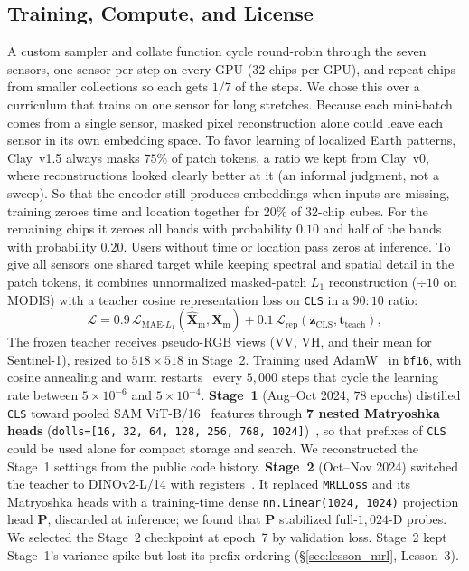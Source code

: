 \subsection{Training, Compute, and License}
\label{sec:lineage}

A custom sampler and collate function cycle round-robin through the seven sensors, one sensor per step on every GPU ($32$ chips per GPU), and repeat chips from smaller collections so each gets $1/7$ of the steps. We chose this over a curriculum that trains on one sensor for long stretches. Because each mini-batch comes from a single sensor, masked pixel reconstruction alone could leave each sensor in its own embedding space. To favor learning of localized Earth patterns, Clay~v1.5 always masks $75\%$ of patch tokens, a ratio we kept from Clay~v0, where reconstructions looked clearly better at it (an informal judgment, not a sweep). So that the encoder still produces embeddings when inputs are missing, training zeroes time and location together for $20\%$ of 32-chip cubes. For the remaining chips it zeroes all bands with probability $0.10$ and half of the bands with probability $0.20$. Users without time or location pass zeros at inference. To give all sensors one shared target while keeping spectral and spatial detail in the patch tokens, it combines unnormalized masked-patch $L_1$ reconstruction ($\div 10$ on MODIS) with a teacher cosine representation loss on \texttt{CLS} in a $90{:}10$ ratio:
{\small
\begin{equation}
\mathcal{L} = 0.9\,\mathcal{L}_{\mathrm{MAE}\text{-}L_1}(\hat{\bm{X}}_{\mathrm{m}}, \bm{X}_{\mathrm{m}}) + 0.1\,\mathcal{L}_{\mathrm{rep}}(\bm{z}_{\mathrm{CLS}}, \bm{t}_{\mathrm{teach}}),
\label{eq:loss}
\end{equation}}%
The frozen teacher receives pseudo-RGB views (VV, VH, and their mean for Sentinel-1), resized to $518\times 518$ in Stage~2. Training used AdamW~\cite{loshchilov2019adamw} in \texttt{bf16}, with cosine annealing and warm restarts~\cite{loshchilov2017sgdr} every $5{,}000$ steps that cycle the learning rate between $5\times 10^{-6}$ and $5\times 10^{-4}$. \textbf{Stage~1} (Aug--Oct 2024, $78$ epochs) distilled \texttt{CLS} toward pooled SAM ViT-B/16~\cite{kirillov2023sam} features through \textbf{7 nested Matryoshka heads} (\texttt{dolls=[16, 32, 64, 128, 256, 768, 1024]})~\cite{kusupati2022matryoshka}, so that prefixes of \texttt{CLS} could be used alone for compact storage and search. We reconstructed the Stage~1 settings from the public code history. \textbf{Stage~2} (Oct--Nov 2024) switched the teacher to DINOv2-L/14 with registers~\cite{darcet2024registers}. It replaced \texttt{MRLLoss} and its Matryoshka heads with a training-time dense \texttt{nn.Linear(1024, 1024)} projection head $\bm{P}$, discarded at inference; we found that $\bm{P}$ stabilized full-$1{,}024\text{-D}$ probes. We selected the Stage~2 checkpoint at epoch~7 by validation loss. Stage~2 kept Stage~1's variance spike but lost its prefix ordering (\S\ref{sec:lesson_mrl}, Lesson~3).

